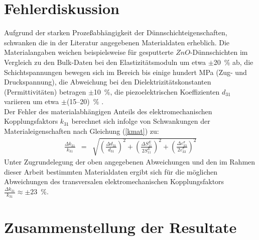 \section{Fehlerdiskussion}

Aufgrund der starken Prozeßabhängigkeit der Dünnschichteigenschaften,
schwanken die in der Literatur angegebenen Materialdaten erheblich.
Die Materialangaben weichen beispielsweise für gesputterte
$ZnO$-Dünnschichten im Vergleich zu den Bulk-Daten bei den
Elastizitätsmoduln um etwa $\pm$20~\% ab, die Schichtspannungen
bewegen sich im Bereich bis einige hundert MPa
(Zug- und Druckspannung), die Abweichung bei den
Dielektrizitätskonstanten (Permittivitäten) betragen $\pm$10~\%,
die piezoelektrischen Koeffizienten $d_{31}$ variieren um etwa
$\pm$(15--20)~\% \cite{Blo90, Hei66, Pol86, Tij91}.\\
Der Fehler des materialabhängigen Anteils des elektromechanischen
Kopplungsfaktors $k_{31}$ berechnet sich infolge von Schwankungen der
Materialeigenschaften nach Gleichung (\ref{kmat}) zu:
\begin{eqnarray}
\label{fehlerkopplfac}
 \frac{{\Delta k_{31}}}{k_{31}} & = & \sqrt{
       {\left( \frac{\Delta d_{31}}{d_{31}} \right)}^2  +
       {\left( \frac{\Delta S_{11}^{E}}{2 S_{11}^{E}} \right)}^2 +
{\left( \frac{\Delta \varepsilon_{33}^{\sigma}}{2 \varepsilon_{33}^{\sigma}}
 \right)}^2 }
\end{eqnarray}
Unter Zugrundelegung der oben angegebenen Abweichungen und den im
Rahmen dieser Arbeit bestimmten Materialdaten ergibt sich für die
möglichen Abweichungen des transversalen elektromechanischen
Kopplungsfaktors $\frac{{\Delta k_{31}}}{k_{31}} \approx \pm23$~\%. \\


\section{Zusammenstellung der Resultate}

